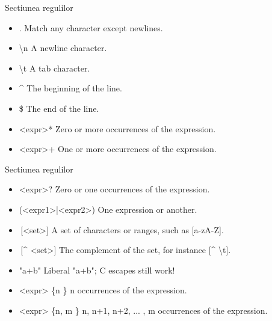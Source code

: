 \documentclass[pdf]{beamer}
\begin{document}
\begin{frame}{Sectiunea regulilor}
\begin{itemize}
\item
. Match any character except newlines.

\item
\textbackslash n A newline character.

\item
\textbackslash t A tab character.

\item
\^{} The beginning of the line.

\item
\$ The end of the line.

\item
\textless expr>* Zero or more occurrences of the expression.

\item
\textless expr>+ One or more occurrences of the expression.

\end{itemize}
\end{frame}



\begin{frame}{Sectiunea regulilor}
\begin{itemize}
\item
\textless expr>? Zero or one occurrences of the expression.

\item
(\textless expr1>|\textless expr2>) One expression or another.

\item
\,[\textless set>] A set of characters or ranges, such as [a-zA-Z].

\item
\,[\^{} \textless set>] The complement of the set, for instance [\^{} \textbackslash t].

\item
"a+b" Liberal "a+b"; C escapes still work!

\item
\textless expr> \{n \} n occurrences of the expression.

\item
\textless expr> \{n, m \} n, n+1, n+2, ... , m occurrences of the expression.
\end{itemize}
\end{frame}
\end{document}
